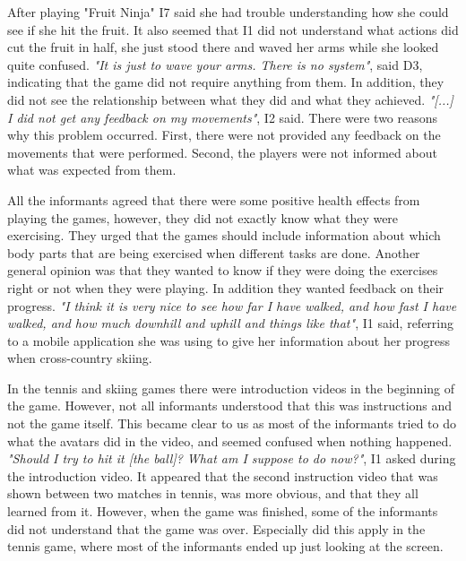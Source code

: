 After playing "Fruit Ninja" I7 said she had trouble understanding how she could see if she hit the fruit. It also seemed that I1 did not understand what actions did cut the fruit in half, she just stood there and waved her arms while she looked quite confused. \emph{"It is just to wave your arms. There is no system"}, said D3, indicating that the game did not require anything from them. In addition, they did not see the relationship between what they did and what they achieved. \emph{"[...] I did not get any feedback on my movements"}, I2 said. There were two reasons why this problem occurred. First, there were not provided any feedback on the movements that were performed. Second, the players were not informed about what was expected from them.  

All the informants agreed that there were some positive health effects from playing the games, however, they did not exactly know what they were exercising. They urged that the games should include information about which body parts that are being exercised when different tasks are done. Another general opinion was that they wanted to know if they were doing the exercises right or not when they were playing. In addition they wanted feedback on their progress. \emph{"I think it is very nice to see how far I have walked, and how fast I have walked, and how much downhill and uphill and things like that"}, I1 said, referring to a mobile application she was using to give her information about her progress when cross-country skiing.   

In the tennis and skiing games there were introduction videos in the beginning of the game. However, not all informants understood that this was instructions and not the game itself. This became clear to us as most of the informants tried to do what the avatars did in the video, and seemed confused when nothing happened. \emph{"Should I try to hit it [the ball]? What am I suppose to do now?"}, I1 asked during the introduction video. It appeared that the second instruction video that was shown between two matches in tennis, was more obvious, and that they all learned from it. However, when the game was finished, some of the informants did not understand that the game was over. Especially did this apply in the tennis game, where most of the informants ended up just looking at the screen. 

